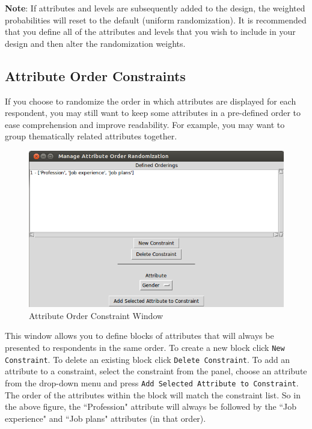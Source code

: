 \documentclass[12pt]{article}
\begin{document}
\textbf{Note}: If attributes and levels are subsequently added to the design, the weighted probabilities will reset to the default (uniform randomization). It is recommended that you define all of the attributes and levels that you wish to include in your design and then alter the randomization weights. 

\subsection{Attribute Order Constraints}

If you choose to randomize the order in which attributes are displayed for each respondent, you may still want to keep some attributes in a pre-defined order to ease comprehension and improve readability. For example, you may want to group thematically related attributes together.

\begin{figure}[ht!]
\centering\includegraphics[scale=.6]{graphics/order_screen.png}
\caption{Attribute Order Constraint Window}
\end{figure}

This window allows you to define blocks of attributes that will always be presented to respondents in the same order. To create a new block click \texttt{New Constraint}. To delete an existing block click \texttt{Delete Constraint}. To add an attribute to a constraint, select the constraint from the panel, choose an attribute from the drop-down menu and press \texttt{Add Selected Attribute to Constraint}. The order of the attributes within the block will match the constraint list. So in the above figure, the ``Profession" attribute will always be followed by the ``Job experience" and ``Job plans" attributes (in that order). 
\end{document}
